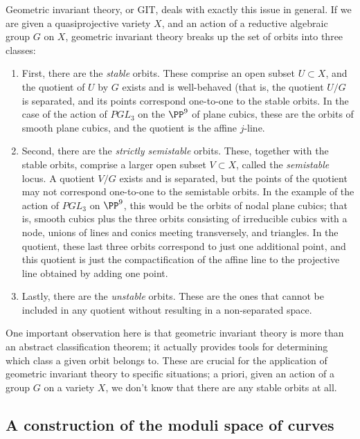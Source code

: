 Geometric invariant theory, or GIT, deals with exactly this issue in general. If we are given a quasiprojective variety $X$, and an action of a reductive algebraic group $G$ on $X$, geometric invariant theory breaks up the set of orbits into three classes: 

\begin{enumerate}

\item First, there are the \emph{stable} orbits. These comprise an open subset $U \subset X$, and the quotient of $U$ by $G$ exists and is well-behaved (that is, the quotient $U/G$ is separated, and its points correspond one-to-one to the stable orbits. In the case of the action of $PGL_3$ on the $\PP^9$ of plane cubics, these are the orbits of smooth plane cubics, and the quotient is the affine $j$-line.

\item Second, there are the \emph{strictly semistable} orbits. These, together with the stable orbits, comprise a larger open subset $V \subset X$, called the \emph{semistable} locus. A quotient $V/G$ exists and is separated, but the points of the quotient may not correspond one-to-one to the semistable orbits. In the example of the action of $PGL_3$ on  $\PP^9$, this would be the orbits of nodal plane cubics; that is, smooth cubics plus the three orbits consisting of irreducible cubics with a node, unions of lines and conics meeting transversely, and triangles. In the quotient, these last three orbits correspond to just one additional point, and this quotient is just the compactification of the affine line to the projective line obtained by adding one point.

\item Lastly, there are the \emph{unstable} orbits. These are the ones that cannot be included in any quotient without resulting in a non-separated space.

\end{enumerate}

One important observation here is that geometric invariant theory is more than an abstract classification theorem; it actually provides tools for determining which class a given orbit belongs to. These are crucial for the application of geometric invariant theory to specific situations; a  priori, given an action of a group $G$ on a variety $X$, we don't know that there are any stable orbits at all.

\subsection{A construction of the moduli space of curves}

